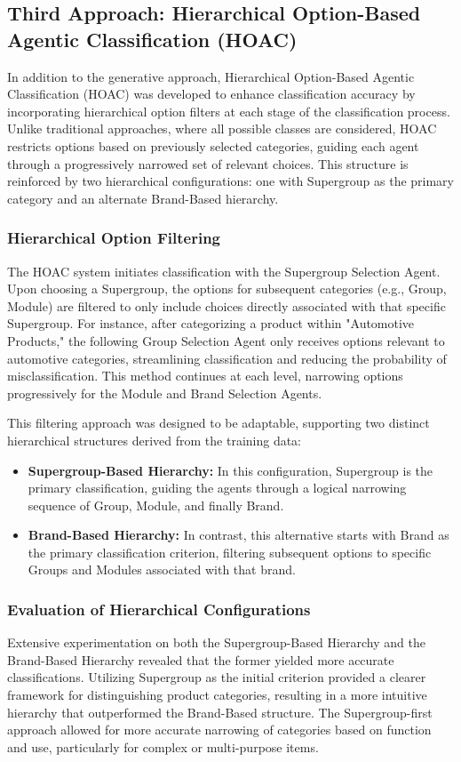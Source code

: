 \documentclass[9pt,a4paper,twoside]{rho-class/rho}
\begin{document}
\subsection{Third Approach: Hierarchical Option-Based Agentic Classification (HOAC)}
In addition to the generative approach, Hierarchical Option-Based Agentic Classification (HOAC) was developed to enhance classification accuracy by incorporating hierarchical option filters at each stage of the classification process. Unlike traditional approaches, where all possible classes are considered, HOAC restricts options based on previously selected categories, guiding each agent through a progressively narrowed set of relevant choices. This structure is reinforced by two hierarchical configurations: one with Supergroup as the primary category and an alternate Brand-Based hierarchy.

\subsubsection{Hierarchical Option Filtering}
The HOAC system initiates classification with the Supergroup Selection Agent. Upon choosing a Supergroup, the options for subsequent categories (e.g., Group, Module) are filtered to only include choices directly associated with that specific Supergroup. For instance, after categorizing a product within "Automotive Products," the following Group Selection Agent only receives options relevant to automotive categories, streamlining classification and reducing the probability of misclassification. This method continues at each level, narrowing options progressively for the Module and Brand Selection Agents.

This filtering approach was designed to be adaptable, supporting two distinct hierarchical structures derived from the training data:
\begin{itemize}
    \item \textbf{Supergroup-Based Hierarchy:} In this configuration, Supergroup is the primary classification, guiding the agents through a logical narrowing sequence of Group, Module, and finally Brand.
    \item \textbf{Brand-Based Hierarchy:} In contrast, this alternative starts with Brand as the primary classification criterion, filtering subsequent options to specific Groups and Modules associated with that brand.
\end{itemize}

\subsubsection{Evaluation of Hierarchical Configurations}
Extensive experimentation on both the Supergroup-Based Hierarchy and the Brand-Based Hierarchy revealed that the former yielded more accurate classifications. Utilizing Supergroup as the initial criterion provided a clearer framework for distinguishing product categories, resulting in a more intuitive hierarchy that outperformed the Brand-Based structure. The Supergroup-first approach allowed for more accurate narrowing of categories based on function and use, particularly for complex or multi-purpose items.
\end{document}
